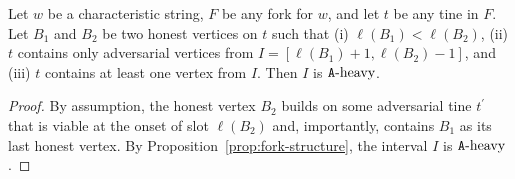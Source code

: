     \begin{corollary}\label{coro:interval-honest-vertices}
      Let $w$ be a characteristic string, 
      $F$ be any fork for $w$, 
      and let $t$ be any tine in $F$.
      Let $B_1$ and $B_2$ be two honest vertices on $t$ such that 
      (i) $\ell(B_1) < \ell(B_2)$, 
      (ii) $t$ contains only adversarial vertices from $I = [\ell(B_1) + 1, \ell(B_2) - 1]$, and 
      (iii) $t$ contains at least one vertex from $I$.
      Then $I$ is $\mathtt{A}\text{-heavy}$. 
    \end{corollary}
    \begin{proof}
      By assumption, 
      the honest vertex $B_2$ builds on some adversarial tine $t^\prime$ 
      that is viable at the onset of slot $\ell(B_2)$ and, importantly, 
      contains $B_1$ as its last honest vertex. 
      By Proposition~\ref{prop:fork-structure}, 
      the interval $I$ is $\mathtt{A}\text{-heavy}$.
    \end{proof}
    









